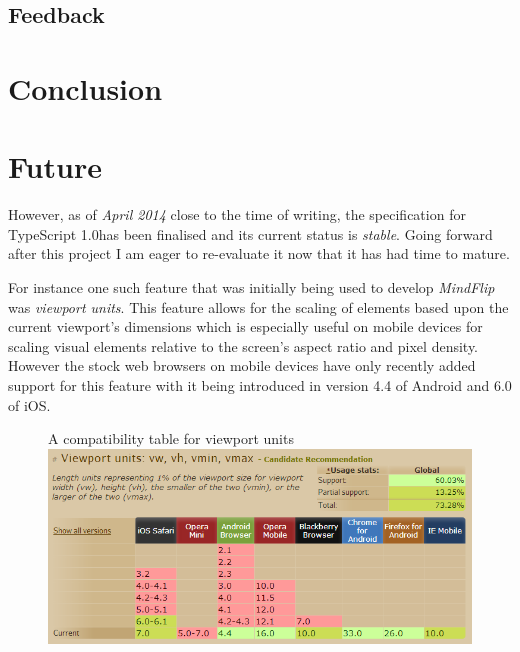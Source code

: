 \documentclass[final]{cmpreport}
\begin{document}

\subsection{Feedback}

\section{Conclusion}

\section{Future}
However, as of \textit{April 2014} close to the time of writing, the specification for TypeScript 1.0\footnotemark has been finalised and its current status is \textit{stable}. Going forward after this project I am eager to re-evaluate it now that it has had time to mature.


For instance one such feature that was initially being used to develop \textit{MindFlip} was \textit{viewport units}. This feature allows for the scaling of elements based upon the current viewport's dimensions which is especially useful on mobile devices for scaling visual elements relative to the screen's aspect ratio and pixel density. However the stock web browsers on mobile devices have only recently added support for this feature with it being introduced in version 4.4 of Android and 6.0 of iOS.

\begin{figure}[h]{A compatibility table for viewport units \label{viewport}}
  \includegraphics[width=1.0\textwidth]{viewport-units.png}
\end{figure}
\end{document}
